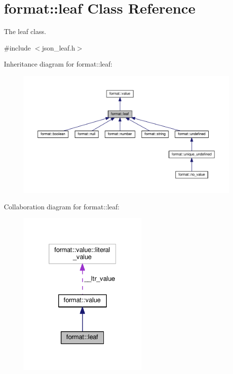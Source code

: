 \hypertarget{classformat_1_1leaf}{}\section{format\+:\+:leaf Class Reference}
\label{classformat_1_1leaf}


The leaf class.  




{\ttfamily \#include $<$json\+\_\+leaf.\+h$>$}



Inheritance diagram for format\+:\+:leaf\+:
\nopagebreak
\begin{figure}[H]
\begin{center}
\leavevmode
\includegraphics[width=350pt]{classformat_1_1leaf__inherit__graph}
\end{center}
\end{figure}


Collaboration diagram for format\+:\+:leaf\+:
\nopagebreak
\begin{figure}[H]
\begin{center}
\leavevmode
\includegraphics[width=183pt]{classformat_1_1leaf__coll__graph}
\end{center}
\end{figure}
